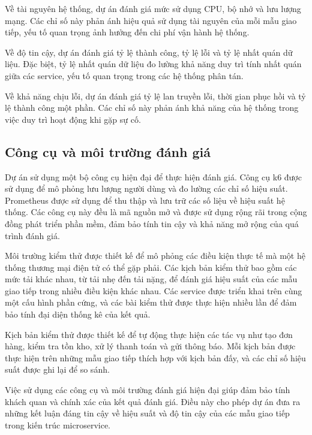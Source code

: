Về tài nguyên hệ thống, dự án đánh giá mức sử dụng CPU, bộ nhớ và lưu lượng mạng. Các chỉ số này phản ánh hiệu quả sử dụng tài nguyên của mỗi mẫu giao tiếp, yếu tố quan trọng ảnh hưởng đến chi phí vận hành hệ thống.

Về độ tin cậy, dự án đánh giá tỷ lệ thành công, tỷ lệ lỗi và tỷ lệ nhất quán dữ liệu. Đặc biệt, tỷ lệ nhất quán dữ liệu đo lường khả năng duy trì tính nhất quán giữa các service, yếu tố quan trọng trong các hệ thống phân tán.

Về khả năng chịu lỗi, dự án đánh giá tỷ lệ lan truyền lỗi, thời gian phục hồi và tỷ lệ thành công một phần. Các chỉ số này phản ánh khả năng của hệ thống trong việc duy trì hoạt động khi gặp sự cố.

\subsection{Công cụ và môi trường đánh giá}
Dự án sử dụng một bộ công cụ hiện đại để thực hiện đánh giá. Công cụ k6 được sử dụng để mô phỏng lưu lượng người dùng và đo lường các chỉ số hiệu suất. Prometheus được sử dụng để thu thập và lưu trữ các số liệu về hiệu suất hệ thống. Các công cụ này đều là mã nguồn mở và được sử dụng rộng rãi trong cộng đồng phát triển phần mềm, đảm bảo tính tin cậy và khả năng mở rộng của quá trình đánh giá.

Môi trường kiểm thử được thiết kế để mô phỏng các điều kiện thực tế mà một hệ thống thương mại điện tử có thể gặp phải. Các kịch bản kiểm thử bao gồm các mức tải khác nhau, từ tải nhẹ đến tải nặng, để đánh giá hiệu suất của các mẫu giao tiếp trong nhiều điều kiện khác nhau. Các service được triển khai trên cùng một cấu hình phần cứng, và các bài kiểm thử được thực hiện nhiều lần để đảm bảo tính đại diện thống kê của kết quả.

Kịch bản kiểm thử được thiết kế để tự động thực hiện các tác vụ như tạo đơn hàng, kiểm tra tồn kho, xử lý thanh toán và gửi thông báo. Mỗi kịch bản được thực hiện trên những mẫu giao tiếp thích hợp với kịch bản đấy, và các chỉ số hiệu suất được ghi lại để so sánh.

Việc sử dụng các công cụ và môi trường đánh giá hiện đại giúp đảm bảo tính khách quan và chính xác của kết quả đánh giá. Điều này cho phép dự án đưa ra những kết luận đáng tin cậy về hiệu suất và độ tin cậy của các mẫu giao tiếp trong kiến trúc microservice.